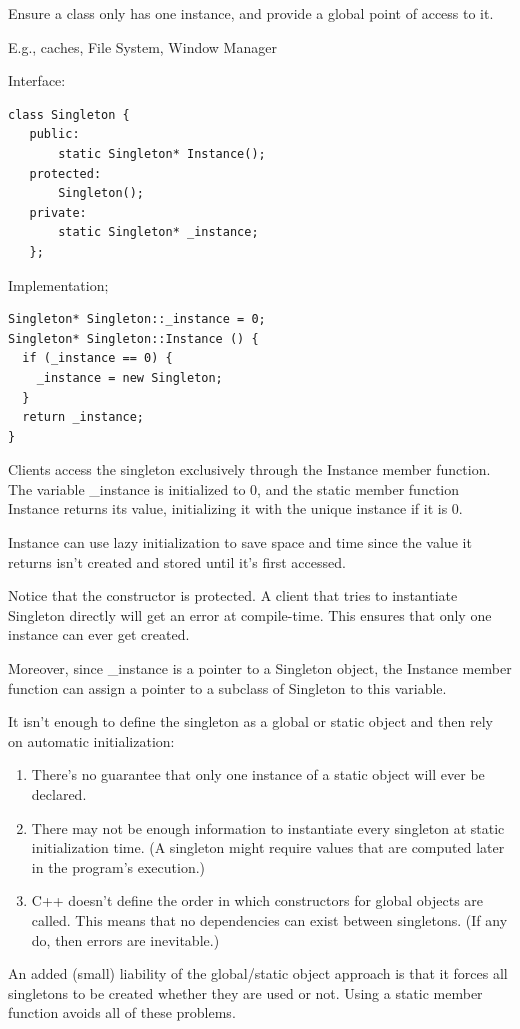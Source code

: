 \documentclass[11pt]{report}
\begin{document}
Ensure a class only has one instance, and provide a global point of access to it.

E.g., caches, File System, Window Manager

Interface:
\begin{lstlisting}
class Singleton {
   public:
       static Singleton* Instance();
   protected:
       Singleton();
   private:
       static Singleton* _instance;
   };
\end{lstlisting}

Implementation;
\begin{lstlisting}
Singleton* Singleton::_instance = 0;
Singleton* Singleton::Instance () {
  if (_instance == 0) {
    _instance = new Singleton;
  }
  return _instance;
}
\end{lstlisting}

Clients access the singleton exclusively through the Instance member function. 
The variable \_instance is initialized to 0, and the static 
member function Instance returns its value, initializing it with the unique instance 
if it is 0. 

Instance can use lazy initialization to save space and time since
the value it returns isn't created and stored until it's first accessed.

Notice that the constructor is protected. A client that tries to instantiate 
Singleton directly will get an error at compile-time. This ensures 
that only one instance can ever get created.

Moreover, since \_instance is a pointer to a Singleton object, 
the Instance member function can assign a pointer to a subclass of 
Singleton to this variable.

It isn't enough to define the singleton as a global or static object and then rely on 
automatic initialization:
\begin{enumerate}
\item There's no guarantee that only one instance of a static object will ever be declared.
\item There may not be enough information to instantiate every singleton at 
static initialization time. (A singleton might require values that are computed later in the program's execution.)
\item C++ doesn't define the order in which constructors for global objects are called.
This means that no dependencies can exist between singletons. (If any do, then errors are inevitable.)
\end{enumerate}
An added (small) liability of the global/static object approach is that it forces 
all singletons to be created whether they are used or not. Using a static member function 
avoids all of these problems.
\end{document}
